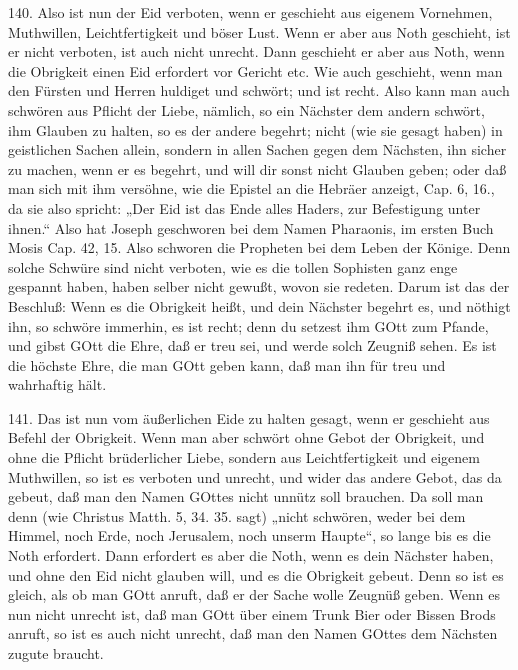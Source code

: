 140. Also ist nun der Eid verboten, wenn er geschieht aus eigenem Vornehmen, Muthwillen, Leichtfertigkeit und böser Lust. Wenn er aber aus Noth geschieht, ist er nicht verboten, ist auch nicht unrecht. Dann geschieht er aber aus Noth, wenn die Obrigkeit einen Eid erfordert vor Gericht etc. Wie auch geschieht, wenn man den Fürsten und Herren huldiget und schwört; und ist recht. Also kann man auch schwören aus Pflicht der Liebe, nämlich, so ein Nächster dem andern schwört, ihm Glauben zu halten, so es der andere begehrt; nicht (wie sie gesagt haben) in geistlichen Sachen allein, sondern in allen Sachen gegen dem Nächsten, ihn sicher zu machen, wenn er es begehrt, und will dir sonst nicht Glauben geben; oder daß man sich mit ihm versöhne, wie die Epistel an die Hebräer anzeigt, Cap. 6, 16., da sie also spricht: „Der Eid ist das Ende alles Haders, zur Befestigung unter ihnen.“ Also hat Joseph geschworen bei dem Namen Pharaonis, im ersten Buch Mosis Cap. 42, 15. Also schworen die Propheten bei dem Leben der Könige. Denn solche Schwüre sind nicht verboten, wie es die tollen Sophisten ganz
enge gespannt haben, haben selber nicht gewußt, wovon sie redeten. Darum ist das der Beschluß: Wenn es die Obrigkeit heißt, und dein Nächster begehrt es, und nöthigt ihn, so schwöre immerhin, es ist recht; denn du setzest ihm GOtt zum Pfande, und gibst GOtt die Ehre, daß er treu sei, und werde solch Zeugniß sehen. Es ist die höchste Ehre, die man GOtt geben kann, daß man ihn für treu und wahrhaftig hält.

141. Das ist nun vom äußerlichen Eide zu halten gesagt, wenn er geschieht aus Befehl der Obrigkeit. Wenn man aber schwört ohne Gebot der Obrigkeit, und ohne die Pflicht brüderlicher Liebe, sondern aus Leichtfertigkeit und eigenem Muthwillen, so ist es verboten und unrecht, und wider das andere Gebot, das da gebeut, daß man den Namen GOttes nicht unnütz soll brauchen. Da soll man denn (wie Christus Matth. 5, 34. 35. sagt) „nicht schwören, weder bei dem Himmel, noch Erde, noch Jerusalem, noch unserm Haupte“, so lange bis es die Noth erfordert. Dann erfordert es aber die Noth, wenn es dein Nächster haben, und ohne den Eid nicht glauben will, und es die Obrigkeit gebeut. Denn so ist es gleich, als ob man GOtt anruft, daß er der Sache wolle Zeugnüß geben. Wenn es nun nicht unrecht ist, daß man GOtt über einem Trunk Bier oder Bissen Brods anruft, so ist es auch nicht unrecht, daß man den Namen GOttes dem Nächsten zugute braucht.

